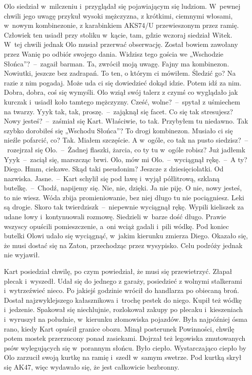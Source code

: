 \documentclass[../MAIN.tex]{subfiles}
\begin{document}
Olo siedział w~milczeniu i~przyglądał się pojawiającym się ludziom. W~pewnej chwili jego uwagę przykuł wysoki mężczyzna, z krótkimi, ciemnymi włosami, w~nowym kombinezonie, z karabinkiem AKS74/U przewieszonym przez ramię. Człowiek ten usiadł przy stoliku w~kącie, tam, gdzie wczoraj siedział Witek. W~tej chwili jednak Olo musiał przerwać obserwację. Został bowiem zawołany przez Wanię po odbiór swojego dania.
\sx Widzisz tego gościa we „Wschodzie Słońca”?~--~zagaił barman.
\xx Ta, zwrócił moją uwagę. Fajny ma kombinezon.
\xx Nowiutki, jeszcze bez zadrapań. To ten, o którym ci mówiłem.
\xx Śledzić go?
\xx Na razie z nim pogadaj. Może uda ci się dowiedzieć dokąd idzie. Potem idź za nim.
\xx Dobra, dobra, coś się wymyśli.
\qm
Olo wziął swój talerz z czymś co wyglądało jak kurczak i~usiadł koło tamtego mężczyzny.
\sx Cześć, wolne?~--~spytał z uśmiechem na twarzy.
\xx Yyy\3k tak, tak, proszę.~--~zająknął się facet.
\xx Co się tak stresujesz? Nowy jesteś?~--~zaśmiał się Kart.
\xx Właściwie, to tak. Przybyłem tu niedawno.
\xx Tak szybko dorobiłeś się „Wschodu Słońca”? To drogi kombinezon. Musiało ci się nieźle pofarcić, co?
\xx Tak. Miałem szczęście.
\xx A w~ogóle, co tak na pusto siedzisz?~--~rozejrzał się Olo.~--~Żadnej flaszki, żarcia, co ty tu w~ogóle robisz?
\xx Już jadłem\3k Yyy\3k~--~zaciął się, marszcząc brwi.
\xx Olo, mów mi Olo.~--~wyciągnął rękę.~--~A ty?
\xx Diego.
\xx Hmm, ciekawe. Skąd taki pseudonim?
\xx Jeszcze z dziesięciolatki. Od nazwiska.
\xx Jasne.~--~Kart schylił się pod ławę i~wyjął półlitrową, szklaną butelkę.~--~Chodź, napijemy się.
\xx Nie, nie, dzięki. Ja nie piję.
\xx O nie, nowy jesteś, to nie wiesz. Wóda zbija promieniowanie, bez niej długo tu nie pociągniesz. Leki są drogie.
\xx Skoro tak twierdzisz\3k~--~niepewnie wyciągnął rękę.
\qm
Wypili kieliszek za udane łowy i~kontynuowali rozmowę. Siedzieli w~barze dość długo. Prawie wszyscy opuścili pomieszczenie, a~oni wciąż gadali i~pili wódkę. Pod koniec butelki Olowi udało się wyciągnąć, w~jakim kierunku zmierza Diego. Okazało się, że musi dostać się na Zaton, przechodząc przez wysypisko. Celu podróży jednak nie wyjawił.

Kart posiedział chwilę, po czym powiedział, że musi się przewietrzyć. Złapał plecak i~wyszedł. Udał się do jednego z garaży, posiedzieć z wolnymi stalkerami i~wytrzeźwieć nieco. Po jakiejś godzinie wrócił do handlarza po obiecaną broń. Dostał najzwyklejszego kałasznikowa i~trochę pestek do niego. Kupił też wódkę i~jedzenie.
Spakował się niechlujnie, rozlokował zakupy po plecaku i~kieszeniach i~wyruszył na południe, w~kierunku złomowiska pojazdów.
Była najpóźniej ósma rano, kiedy Kart opuścił granice obozu. Minął posterunek Powinności, chwilę potem mostek przerzucony ponad zasiekami. Dojrzał też legowiska zmutowanych psów wylegujących się w~porannym słońcu. Było ciepło. Wystarczająco ciepło by Olo zarzucił swoją kurtkę na ramię i~szedł w~samym swetrze. Pod kurtką skrył się AK47, więc wydawało się, że jest całkowicie bezbronny.
\end{document}
